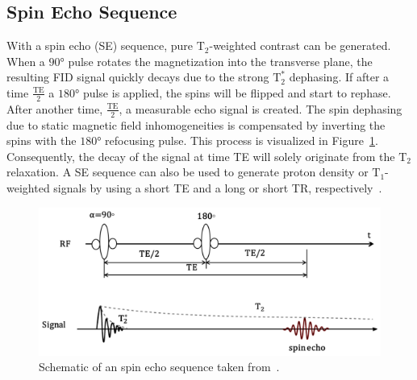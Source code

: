 \documentclass[english,version-2022-01]{uzl-thesis} %
\begin{document}
\subsection{Spin Echo Sequence}
With a spin echo (SE) sequence, pure $\text{T}_2$-weighted contrast can be generated. When a $90°$ pulse rotates the magnetization into the transverse plane, the resulting FID signal quickly decays due to the strong $\text{T}^*_2$ dephasing. If after a time $\frac{\text{TE}}{2}$ a $180°$ pulse is applied, the spins will be flipped and start to rephase. After another time, $\frac{\text{TE}}{2}$, a measurable echo signal is created. The spin dephasing due to static magnetic field inhomogeneities is compensated by inverting the spins with the $180°$ refocusing pulse. This process is visualized in Figure~\ref{fig:SpinEcho}.\\
Consequently, the decay of the signal at time TE will solely originate from the $\text{T}_2$ relaxation. A SE sequence can also be used to generate proton density or $\text{T}_1$-weighted signals by using a short TE and a long or short TR, respectively~\cite{PulseSequences}.

\begin{figure}[htpb]
	\centering
	\graphicspath{{images/}{\main/images/}}
	\includegraphics[width=\linewidth]{SpinEcho.png} 
	\caption{Schematic of an spin echo sequence taken from~\cite{PulseSequences}.}
	\label{fig:SpinEcho}
\end{figure}


\end{document}
